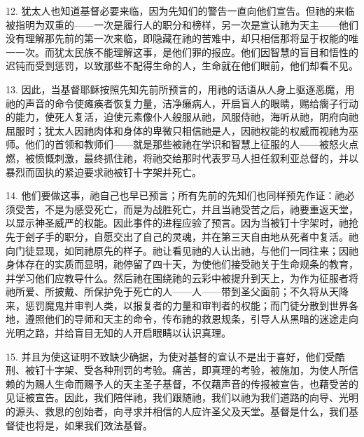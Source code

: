 12. 犹太人也知道基督必要来临，因为先知们的警告一直向他们宣告。但祂的来临被指明为双重的——一次是履行人的职分和榜样，另一次是宣认祂为天主——他们没有理解那先前的第一次来临，即隐藏在祂的苦难中，却只相信那将显于权能的唯一一次。而犹太民族不能理解这事，是他们罪的报应。他们因智慧的盲目和悟性的迟钝而受到惩罚，以致那些不配得生命的人，生命就在他们眼前，他们却看不见。\par

13. 因此，当基督耶稣按照先知先前所预言的，用祂的话语从人身上驱逐恶魔，用祂的声音的命令使瘫痪者恢复力量，洁净癞病人，开启盲人的眼睛，赐给瘸子行动的能力，使死人复活，迫使元素像仆人般服从祂，风服侍祂，海听从祂，阴府向祂屈服时；犹太人因祂肉体和身体的卑微只相信祂是人，因祂权能的权威而视祂为巫师。他们的首领和教师们——就是那些被祂在学识和智慧上征服的人——被怒火点燃，被愤慨刺激，最终抓住祂，将祂交给那时代表罗马人担任叙利亚总督的，并以暴烈而固执的紧迫要求祂被钉十字架并死亡。\par

14. 他们要做这事，祂自己也早已预言；所有先前的先知们也同样预先作证：祂必须受苦，不是为感受死亡，而是为战胜死亡，并且当祂受苦之后，祂要重返天堂，以显示神圣威严的权能。因此事件的进程应验了预言。因为当被钉十字架时，祂抢先于刽子手的职分，自愿交出了自己的灵魂，并在第三天自由地从死者中复活。祂向门徒显现，如同祂原先的样子。祂让看见祂的人认出祂，与他们一同往来；因祂身体存在的实质而显明，祂停留了四十天，为使他们接受祂关于生命规条的教育，并学习他们应教导什么。然后祂在围绕祂的云彩中被提升到天上，为作为征服者将祂所爱、所披戴、所保护免于死亡的人——人——带到圣父面前；不久将从天降来，惩罚魔鬼并审判人类，以报复者的力量和审判者的权能；而门徒分散到世界各地，遵照他们的导师和天主的命令，传布祂的救恩规条，引导人从黑暗的迷途走向光明之路，并给盲目无知的人开启眼睛以认识真理。\par

15. 并且为使这证明不致缺少确据，为使对基督的宣认不是出于喜好，他们受酷刑、被钉十字架、受各种刑罚的考验。痛苦，即真理的考验，被施加，为使人所信赖的为赐人生命而赐予人的天主圣子基督，不仅藉声音的传报被宣告，也藉受苦的见证被宣告。因此，我们陪伴祂，我们跟随祂，我们以祂为我们道路的向导、光明的源头、救恩的创始者，向寻求并相信的人应许圣父及天堂。基督是什么，我们基督徒也将是，如果我们效法基督。\par



